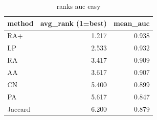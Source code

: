 \begin{table}[t]
\centering
\caption{ranks auc easy}
\label{tab:ranks_auc_easy}
\begin{tabular}{lrr}
\hline
method & avg\_rank (1=best) & mean\_auc \\
\hline
RA+ & 1.217 & 0.938 \\
LP & 2.533 & 0.932 \\
RA & 3.417 & 0.909 \\
AA & 3.617 & 0.907 \\
CN & 5.400 & 0.899 \\
PA & 5.617 & 0.847 \\
Jaccard & 6.200 & 0.879 \\
\hline
\end{tabular}
\end{table}